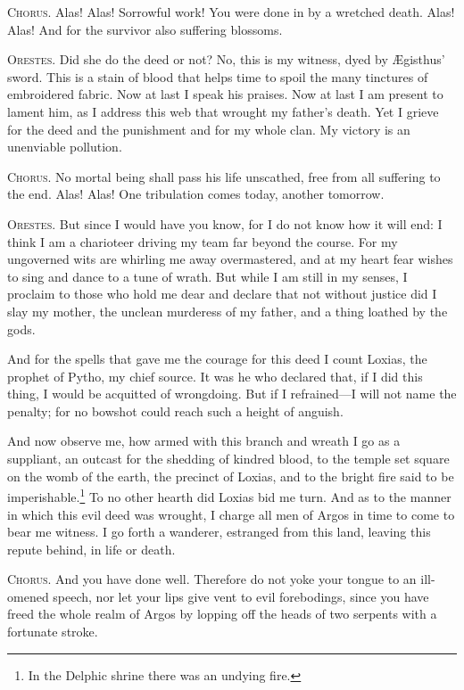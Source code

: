 \documentclass[12pt]{article}
\begin{document}
\textsc{Chorus.} Alas! Alas! Sorrowful work! You were done in by a wretched death. Alas! Alas! And for the survivor also suffering blossoms.

\textsc{Orestes.} Did she do the deed or not? No, this is my witness, dyed by {\AE}gisthus' sword. This is a stain of blood that helps time to spoil the many tinctures of embroidered fabric. Now at last I speak his praises. Now at last I am present to lament him, as I address this web that wrought my father's death. Yet I grieve for the deed and the punishment and for my whole clan. My victory is an unenviable pollution.

\textsc{Chorus.} No mortal being shall pass his life unscathed, free from all suffering to the end. Alas! Alas! One tribulation comes today, another tomorrow.

\textsc{Orestes.} But since I would have you know, for I do not know how it will end: I think I am a charioteer driving my team far beyond the course. For my ungoverned wits are whirling me away overmastered, and at my heart fear wishes to sing and dance to a tune of wrath. But while I am still in my senses, I proclaim to those who hold me dear and declare that not without justice did I slay my mother, the unclean murderess of my father, and a thing loathed by the gods.

And for the spells that gave me the courage for this deed I count Loxias, the prophet of Pytho, my chief source. It was he who declared that, if I did this thing, I would be acquitted of wrongdoing. But if I refrained---I will not name the penalty; for no bowshot could reach such a height of anguish.

And now observe me, how armed with this branch and wreath I go as a suppliant, an outcast for the shedding of kindred blood, to the temple set square on the womb of the earth, the precinct of Loxias, and to the bright fire said to be imperishable.\footnote{In the Delphic shrine there was an undying fire.} To no other hearth did Loxias bid me turn. And as to the manner in which this evil deed was wrought, I charge all men of Argos in time to come to bear me witness. I go forth a wanderer, estranged from this land, leaving this repute behind, in life or death.

\textsc{Chorus.} And you have done well. Therefore do not yoke your tongue to an ill-omened speech, nor let your lips give vent to evil forebodings, since you have freed the whole realm of Argos by lopping off the heads of two serpents with a fortunate stroke.
\end{document}
